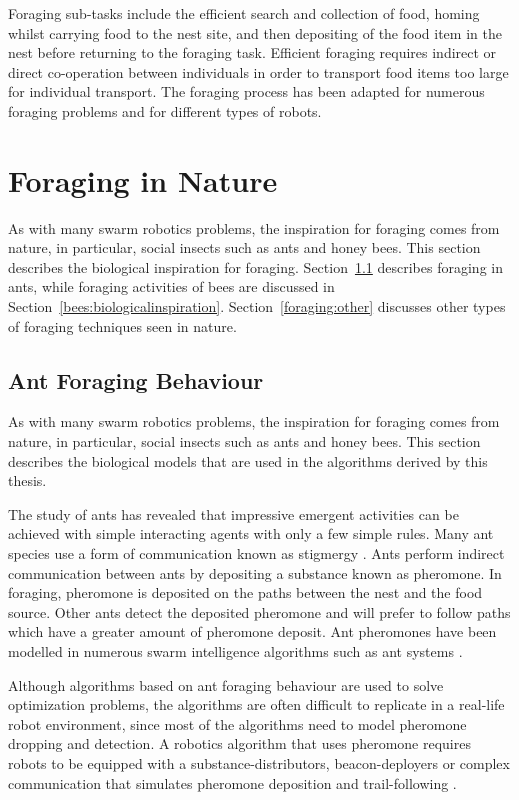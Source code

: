 Foraging sub-tasks include the efficient search and collection of food, homing whilst carrying food to the nest site, and then depositing of the food item in the nest before returning to the foraging task. Efficient foraging requires indirect or direct co-operation between individuals in order to transport food items too large for individual transport. The foraging process has been adapted for numerous foraging problems and for different types of robots.


\section{Foraging in Nature}
\label{foraginginnature}
As with many swarm robotics problems, the inspiration for foraging comes from nature, in particular, social insects such as ants and honey bees. This section describes the biological inspiration for foraging. Section~\ref{biological:ants} describes foraging in ants, while foraging activities of bees are discussed in Section~\ref{bees:biologicalinspiration}. Section~\ref{foraging:other} discusses other types of foraging techniques seen in nature.


\subsection{Ant Foraging Behaviour}
\label{biological:ants}
As with many swarm robotics problems, the inspiration for foraging comes from nature, in particular, social insects such as ants and honey bees. This section describes the biological models that are used in the algorithms derived by this thesis. 

The study of ants has revealed that impressive emergent activities can be achieved with simple interacting agents with only a few simple rules. Many ant species use a form of communication known as stigmergy \cite{dorigo2000ant}. Ants perform indirect communication between ants by depositing a substance known as pheromone. In foraging, pheromone is deposited on the paths between the nest and the food source. Other ants detect the deposited pheromone and will prefer to follow paths which have a greater amount of pheromone deposit. Ant pheromones have been modelled in numerous swarm intelligence algorithms such as ant systems \cite{dorigo2006ant, dorigo2010ant}. 
 
Although algorithms based on ant foraging behaviour are used to solve optimization problems, the algorithms are often difficult to replicate in a real-life robot environment, since most of the algorithms need to model pheromone dropping and detection. A robotics algorithm that uses pheromone requires robots to be equipped with a substance-distributors, beacon-deployers or complex communication that simulates pheromone deposition and trail-following \cite{hoff2010two}.

